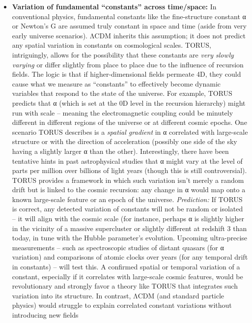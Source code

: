 \documentclass[]{article}
\begin{document}
\begin{itemize}
\item
  \textbf{Variation of fundamental ``constants'' across time/space:} In
  conventional physics, fundamental constants like the fine-structure
  constant α or Newton's G are assumed truly constant in space and time
  (aside from very early universe scenarios). ΛCDM inherits this
  assumption; it does not predict any spatial variation in constants on
  cosmological scales. TORUS, intriguingly, allows for the possibility
  that these constants are \emph{very slowly varying} or differ slightly
  from place to place due to the influence of recursion fields. The
  logic is that if higher-dimensional fields permeate 4D, they could
  cause what we measure as ``constants'' to effectively become dynamic
  variables that respond to the state of the universe. For example,
  TORUS predicts that α (which is set at the 0D level in the recursion
  hierarchy) might run with scale -- meaning the electromagnetic
  coupling could be minutely different in different regions of the
  universe or at different cosmic epochs​. One scenario TORUS describes
  is a \emph{spatial gradient} in α correlated with large-scale
  structure or with the direction of acceleration (possibly one side of
  the sky having a slightly larger α than the other)​. Interestingly,
  there have been tentative hints in past astrophysical studies that α
  might vary at the level of parts per million over billions of light
  years (though this is still controversial). TORUS provides a framework
  in which such variation isn't merely a random drift but is linked to
  the cosmic recursion: any change in α would map onto a known
  large-scale feature or an epoch of the universe. \emph{Prediction:} If
  TORUS is correct, any detected variation of constants will not be
  random or isolated -- it will align with the cosmic scale (for
  instance, perhaps α is slightly higher in the vicinity of a massive
  supercluster or slightly different at redshift 3 than today, in tune
  with the Hubble parameter's evolution. Upcoming ultra-precise
  measurements -- such as spectroscopic studies of distant quasars (for
  α variation) and comparisons of atomic clocks over years (for any
  temporal drift in constants) -- will test this​. A confirmed spatial
  or temporal variation of a constant, especially if it correlates with
  large-scale cosmic features, would be revolutionary and strongly favor
  a theory like TORUS that integrates such variation into its structure.
  In contrast, ΛCDM (and standard particle physics) would struggle to
  explain correlated constant variations without introducing new fields

\end{itemize}
\end{document}
